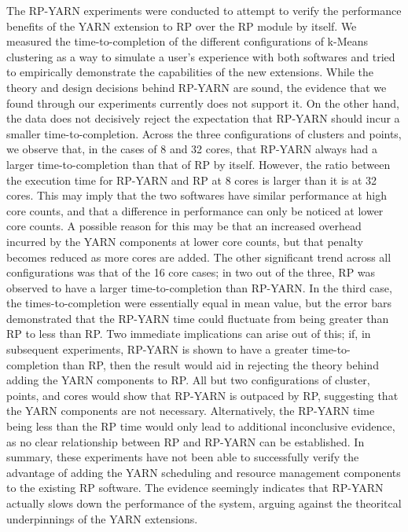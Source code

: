 \documentclass[]{article}
\begin{document}
    The RP-YARN experiments were conducted to attempt to verify the performance benefits of the YARN extension to RP over the RP module by itself. We measured the time-to-completion of the different configurations of k-Means clustering as a way to simulate a user's experience with both softwares and tried to empirically demonstrate the capabilities of the new extensions. While the theory and design decisions behind RP-YARN are sound, the evidence that we found through our experiments currently does not support it. On the other hand, the data does not decisively reject the expectation that RP-YARN should incur a smaller time-to-completion. Across the three configurations of clusters and points, we observe that, in the cases of 8 and 32 cores, that RP-YARN always had a larger time-to-completion than that of RP by itself. However, the ratio between the execution time for RP-YARN and RP at 8 cores is larger than it is at 32 cores. This may imply that the two softwares have similar performance at high core counts, and that a difference in performance can only be noticed at lower core counts. A possible reason for this may be that an increased overhead incurred by the YARN components at lower core counts, but that penalty becomes reduced as more cores are added. The other significant trend across all configurations was that of the 16 core cases; in two out of the three, RP was observed to have a larger time-to-completion than RP-YARN. In the third case, the times-to-completion were essentially equal in mean value, but the error bars demonstrated that the RP-YARN time could fluctuate from being greater than RP to less than RP. Two immediate implications can arise out of this; if, in subsequent experiments, RP-YARN is shown to have a greater time-to-completion than RP, then the result would aid in rejecting the theory behind adding the YARN components to RP. All but two configurations of cluster, points, and cores would show that RP-YARN is outpaced by RP, suggesting that the YARN components are not necessary. Alternatively, the RP-YARN time being less than the RP time would only lead to additional inconclusive evidence, as no clear relationship between RP and RP-YARN can be established. In summary, these experiments have not been able to successfully verify the advantage of adding the YARN scheduling and resource management components to the existing RP software. The evidence seemingly indicates that RP-YARN actually slows down the performance of the system, arguing against the theoritcal underpinnings of the YARN extensions.
\end{document}
